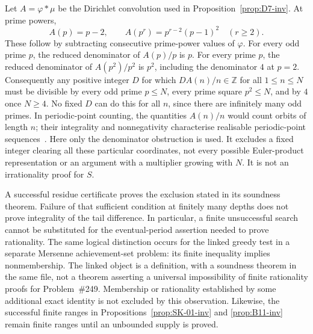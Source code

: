 \begin{obs}\label{prop:D6-kill}
Let $A=\varphi*\mu$ be the Dirichlet convolution used in
Proposition~\ref{prop:D7-inv}. At prime powers,
\[
 A(p)=p-2,\qquad
 A(p^r)=p^{r-2}(p-1)^2\quad(r\ge2).
\]
These follow by subtracting consecutive prime-power values of
$\varphi$. For every odd prime $p$, the reduced denominator of
$A(p)/p$ is $p$. For every prime $p$, the reduced denominator of
$A(p^2)/p^2$ is $p^2$, including the denominator $4$ at $p=2$.
Consequently any positive integer $D$ for which
$DA(n)/n\in\mathbb Z$ for all $1\le n\le N$ must be divisible
by every odd prime $p\le N$, every prime square $p^2\le N$, and
by $4$ once $N\ge4$. No fixed $D$ can do this for all $n$, since
there are infinitely many odd primes.
In periodic-point counting, the quantities $A(n)/n$ would count
orbits of length $n$; their integrality and nonnegativity characterise
realisable periodic-point sequences~\cite[Lemma~3.1, p.~5]{everest-periodic}.
Here only the denominator obstruction is used. It excludes a fixed
integer clearing all these particular coordinates, not every possible
Euler-product representation or an argument with a multiplier growing
with $N$. It is not an irrationality proof for $S$.
\end{obs}

\begin{obs}\label{prop:B11cert-kill}
A successful residue certificate proves the exclusion stated in its
soundness theorem. Failure of that sufficient condition at finitely
many depths does not prove integrality of the tail difference. In
particular, a finite unsuccessful search cannot be substituted for
the eventual-period assertion needed to prove rationality.
The same logical distinction occurs for the linked greedy test in a
separate Mersenne achievement-set problem: its finite inequality
implies nonmembership. The linked object is a definition, with a
soundness theorem in the same file, not a theorem asserting a universal
impossibility of finite rationality proofs for Problem~\#249.
Membership or rationality established by some additional exact identity
is not excluded by this observation. Likewise, the successful finite
ranges in Propositions~\ref{prop:SK-01-inv} and \ref{prop:B11-inv}
remain finite ranges until an unbounded supply is proved.
\end{obs}
